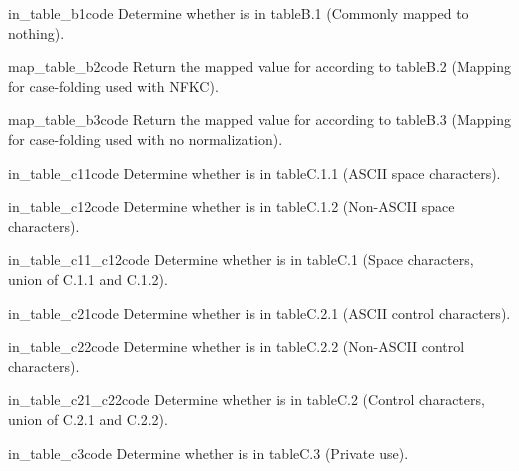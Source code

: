 \begin{funcdesc}{in_table_b1}{code}
Determine whether  is in table{B.1} (Commonly mapped to
nothing).
\end{funcdesc}

\begin{funcdesc}{map_table_b2}{code}
Return the mapped value for  according to table{B.2} 
(Mapping for case-folding used with NFKC).
\end{funcdesc}

\begin{funcdesc}{map_table_b3}{code}
Return the mapped value for  according to table{B.3} 
(Mapping for case-folding used with no normalization).
\end{funcdesc}

\begin{funcdesc}{in_table_c11}{code}
Determine whether  is in table{C.1.1} 
(ASCII space characters).
\end{funcdesc}

\begin{funcdesc}{in_table_c12}{code}
Determine whether  is in table{C.1.2} 
(Non-ASCII space characters).
\end{funcdesc}

\begin{funcdesc}{in_table_c11_c12}{code}
Determine whether  is in table{C.1} 
(Space characters, union of C.1.1 and C.1.2).
\end{funcdesc}

\begin{funcdesc}{in_table_c21}{code}
Determine whether  is in table{C.2.1} 
(ASCII control characters).
\end{funcdesc}

\begin{funcdesc}{in_table_c22}{code}
Determine whether  is in table{C.2.2} 
(Non-ASCII control characters).
\end{funcdesc}

\begin{funcdesc}{in_table_c21_c22}{code}
Determine whether  is in table{C.2} 
(Control characters, union of C.2.1 and C.2.2).
\end{funcdesc}

\begin{funcdesc}{in_table_c3}{code}
Determine whether  is in table{C.3} 
(Private use).
\end{funcdesc}

